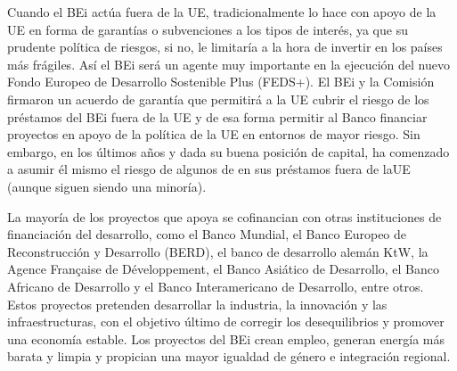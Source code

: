 \documentclass[10pt,a4paper]{article}
\begin{document}
{Cuando el BEi actúa fuera de la UE, tradicionalmente lo hace con apoyo de la UE en forma de garantías o subvenciones a los tipos de interés, ya que su prudente política de riesgos, si no, le limitaría a la hora de invertir en los países más frágiles. Así el BEi será un agente muy importante en la ejecución del nuevo Fondo Europeo de Desarrollo Sostenible Plus (FEDS+). El BEi y la Comisión firmaron un acuerdo de garantía que permitirá a la UE cubrir el riesgo de los préstamos del BEi fuera de la UE y de esa forma permitir al Banco financiar proyectos en apoyo de la política de la UE en entornos de mayor riesgo. Sin embargo, en los últimos años y dada su buena posición de capital, ha comenzado a asumir él mismo el riesgo de algunos de en sus préstamos fuera de laUE (aunque siguen siendo una minoría).

La mayoría de los proyectos que apoya se cofinancian con otras instituciones de financiación del desarrollo, como el Banco Mundial, el Banco Europeo de Reconstrucción y Desarrollo (BERD), el banco de desarrollo alemán KtW, la Agence Française de Développement, el Banco Asiático de Desarrollo, el Banco Africano de Desarrollo y el Banco Interamericano de Desarrollo, entre otros. Estos proyectos pretenden desarrollar la industria, la innovación y las infraestructuras, con el objetivo último de corregir los desequilibrios y promover una economía estable. Los proyectos del BEi crean empleo, generan energía más barata y limpia y propician una mayor igualdad de género e integración regional.


}
\end{document}
